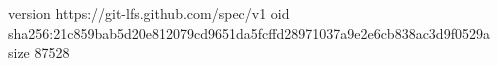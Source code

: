 version https://git-lfs.github.com/spec/v1
oid sha256:21c859bab5d20e812079cd9651da5fcffd28971037a9e2e6cb838ac3d9f0529a
size 87528
